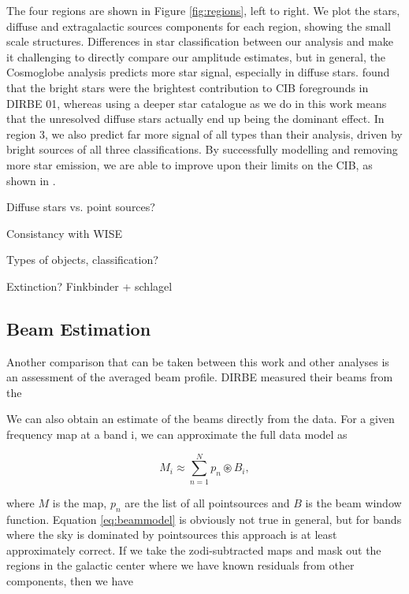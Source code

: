 \documentclass{aa}
\begin{document}
The four regions are shown in Figure \ref{fig:regions}, left to right. We plot the stars, diffuse and extragalactic sources components for each region, showing the small scale structures. Differences in star classification between our analysis and \cite{DIRBE2mass} make it challenging to directly compare our amplitude estimates, but in general, the Cosmoglobe analysis predicts more star signal, especially in diffuse stars. \cite{DIRBE2mass} found that the bright stars were the brightest contribution to CIB foregrounds in DIRBE 01, whereas using a deeper star catalogue as we do in this work means that the unresolved diffuse stars actually end up being the dominant effect. In region 3, we also predict far more signal of all types than their analysis, driven by bright sources of all three classifications. By successfully modelling and removing more star emission, we are able to improve upon their limits on the CIB, as shown in \cite{CG02_02}. 


Diffuse stars vs. point sources? 

Consistancy with WISE

Types of objects, classification?

Extinction? Finkbinder + schlagel

\subsection{Beam Estimation}

Another comparison that can be taken between this work and other analyses is an assessment of the averaged beam profile. DIRBE measured their beams from the 

We can also obtain an estimate of the beams directly from the data. For a given frequency map at a band i, we can approximate the full data model as 

\begin{equation}
M_i \approx \sum_{n=1}^{N} p_n \circledast B_i,
\label{eq:beammodel}
\end{equation}

where $M$ is the map, $p_n$ are the list of all pointsources and $B$ is the beam window function. Equation \ref{eq:beammodel} is obviously not true in general, but for bands where the sky is dominated by pointsources this approach is at least approximately correct. If we take the zodi-subtracted maps and mask out the regions in the galactic center where we have known residuals from other components, then we have 
\end{document}
